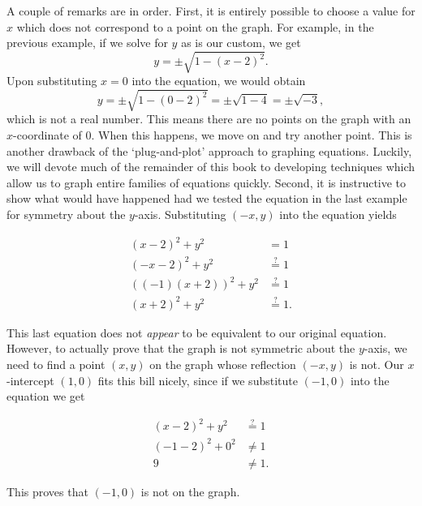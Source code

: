 \medskip

A couple of remarks are in order.  First, it is entirely possible to choose a value for $x$ which does not correspond to a point on the graph.  For example, in the previous example, if we solve for $y$ as is our custom, we get
\[y = \pm \sqrt{1-(x-2)^2}.\]
Upon substituting $x=0$ into the equation, we would obtain
\[y = \pm \sqrt{1 - (0-2)^2} = \pm \sqrt{1 - 4} = \pm \sqrt{-3},\]
which is not a real number.  This means there are no points on the graph with an $x$-coordinate of $0$.  When this happens, we move on and try another point.  This is another drawback of the `plug-and-plot' approach to graphing equations.  Luckily, we will devote much of the remainder of this book to developing techniques which allow us to graph entire families of equations quickly.  Second, it is instructive to show what would have happened had we tested the equation in the last example for symmetry about the $y$-axis.  Substituting $(-x,y)$ into the equation yields


\begin{align*}
(x-2)^2 + y^2 & =  1  \\
(-x-2)^2 + y^2 & \stackrel{?}{=}  1  \\
((-1)(x+2))^2 + y^2 & \stackrel{?}{=}  1  \\
(x+2)^2 + y^2 & \stackrel{?}{=}  1. 
\end{align*}

This last equation does not \emph{appear} to be equivalent to our original equation.  However, to actually prove that the graph is not symmetric about the $y$-axis, we need to find a point $(x,y)$ on the graph whose reflection $(-x,y)$ is not. Our $x$-intercept $(1,0)$ fits this bill nicely, since if we substitute $(-1,0)$ into the equation we get

\begin{align*}
(x-2)^2+y^2 & \stackrel{?}{=}  1  \\
(-1-2)^2 + 0^2 & \neq  1  \\
9 & \neq  1. 
\end{align*}

This proves that $(-1,0)$ is not on the graph.

